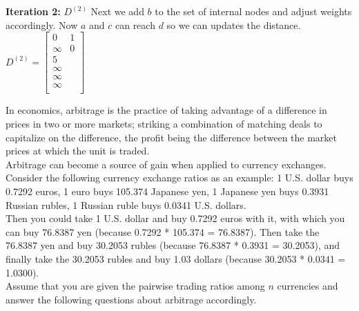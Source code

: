 \documentclass[addpoints,11pt,answers]{exam}
\begin{document}
\begin{questions}
 \begin{solution}
   {\bf Iteration 2:} $D^{(2)}$ Next we add $b$ to the set of internal nodes and adjust weights accordingly.
   Now $a$ and $c$ can reach $d$ so we can updates the distance.
 $D^{(2)}=\begin{bmatrix}
   0 & 1 \\
   \infty & 0\\
   5 & \\
   \infty\\
   \infty\\
   \infty\\
\end{bmatrix}$\\

  
 
 \end{solution}
 

\question
In economics, arbitrage is the practice of taking advantage of a difference in prices in two or more markets; striking a combination of matching deals to capitalize on the difference, the profit being the difference between the market prices at which the unit is traded.\\

Arbitrage can become a source of gain when applied to currency exchanges. Consider the following currency exchange ratios as an example: 1 U.S. dollar buys 0.7292 euros, 
1 euro buys 105.374 Japanese yen, 1 Japanese yen buys 0.3931 Russian rubles, 1 Russian ruble buys 0.0341 U.S. dollars.\\

Then you could take 1 U.S. dollar and buy 0.7292 euros with it, with which you can buy 76.8387 yen (because 0.7292 * 105.374 = 76.8387). Then take the 76.8387 yen and buy 30.2053 rubles (because 76.8387 * 0.3931 = 30.2053), and finally take the 30.2053 rubles and buy 1.03 dollars (because 30.2053 * 0.0341 = 1.0300). \\

Assume that you are given the pairwise trading ratios among $n$ currencies and answer the following questions about arbitrage accordingly.

\end{questions}
\end{document}
